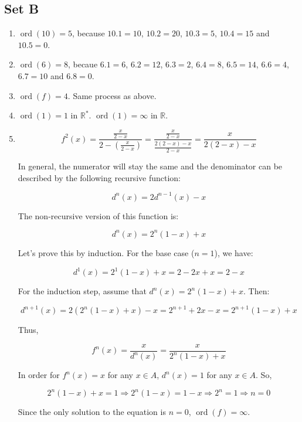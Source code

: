 \documentclass{article}
\DeclareMathOperator{\ord}{ord}
\begin{document}
\subsection{Set B}
\begin{enumerate}
    \item $ \ord(10) = 5 $, because $ 10.1 = 10 $, $ 10.2 = 20 $, $ 10.3 = 5 $, $ 10.4 = 15 $ and $ 10.5 = 0 $.

    \item $ \ord(6) = 8 $, becaue $ 6.1 = 6 $, $ 6.2 = 12 $, $ 6.3 = 2 $, $ 6.4 = 8 $, $ 6.5 = 14 $, $ 6.6 = 4 $, $ 6.7 = 10 $ and $ 6.8 = 0 $.

    \item $ \ord(f) = 4 $. Same process as above.

    \item $ \ord(1) = 1 $ in $ \mathbb{R}^* $. $ \ord(1) = \infty $ in $ \mathbb{R} $.

    \item $$ f^2(x) = \frac{\frac{x}{2-x}}{2 - \left(\frac{x}{2 - x}\right)} = \frac{\frac{x}{2-x}}{\frac{2(2 - x) - x}{2 - x}} = \frac{x}{2(2 - x) - x} $$

    In general, the numerator will stay the same and the denominator can be described by the following recursive function:

    $$
        d^n(x) = 2d^{n - 1}(x) - x
    $$
    
    The non-recursive version of this function is:

    $$
        d^n(x) = 2^n(1 - x) + x
    $$

    Let's prove this by induction. For the base case ($ n = 1 $), we have:

    $$ 
        d^1(x) = 2^1(1 - x) + x = 2 - 2x + x = 2 - x
    $$

    For the induction step, assume that $ d^n(x) = 2^n(1 - x) + x $. Then:
    
    $$ d^{n + 1}(x) = 2(2^n(1 - x) + x) - x = 2^{n + 1} + 2x - x = 2^{n + 1}(1 - x) + x $$

    Thus,

    $$ f^n(x) = \frac{x}{d^n(x)} = \frac{x}{2^n(1 - x) + x} $$
    
    In order for $ f^n(x) = x $ for any $ x \in A $, $ d^n(x) = 1 $ for any $ x \in A $. So,

    $$ 
        2^n(1 - x) + x = 1 \Rightarrow 2^n(1 - x) = 1 - x \Rightarrow 2^n = 1 \Rightarrow n = 0
    $$

    Since the only solution to the equation is $ n = 0 $, $ \ord(f) = \infty$.


\end{enumerate}
\end{document}
